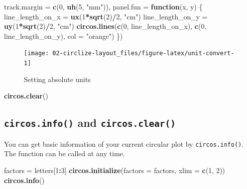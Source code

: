 \documentclass[]{book}
\newenvironment{Shaded}{\begin{snugshade}}{\end{snugshade}}
\newcommand{\KeywordTok}[1]{\textcolor[rgb]{0.13,0.29,0.53}{\textbf{#1}}}
\newcommand{\DataTypeTok}[1]{\textcolor[rgb]{0.13,0.29,0.53}{#1}}
\newcommand{\DecValTok}[1]{\textcolor[rgb]{0.00,0.00,0.81}{#1}}
\newcommand{\StringTok}[1]{\textcolor[rgb]{0.31,0.60,0.02}{#1}}
\newcommand{\ControlFlowTok}[1]{\textcolor[rgb]{0.13,0.29,0.53}{\textbf{#1}}}
\newcommand{\OperatorTok}[1]{\textcolor[rgb]{0.81,0.36,0.00}{\textbf{#1}}}
\newcommand{\NormalTok}[1]{#1}
\begin{document}
\begin{Shaded}
\begin{Highlighting}[]
    \DataTypeTok{track.margin =} \KeywordTok{c}\NormalTok{(}\DecValTok{0}\NormalTok{, }\KeywordTok{uh}\NormalTok{(}\DecValTok{5}\NormalTok{, }\StringTok{"mm"}\NormalTok{)),}
    \DataTypeTok{panel.fun =} \ControlFlowTok{function}\NormalTok{(x, y) \{}
\NormalTok{        line_length_on_x =}\StringTok{ }\KeywordTok{ux}\NormalTok{(}\DecValTok{1}\OperatorTok{*}\KeywordTok{sqrt}\NormalTok{(}\DecValTok{2}\NormalTok{)}\OperatorTok{/}\DecValTok{2}\NormalTok{, }\StringTok{"cm"}\NormalTok{)}
\NormalTok{        line_length_on_y =}\StringTok{ }\KeywordTok{uy}\NormalTok{(}\DecValTok{1}\OperatorTok{*}\KeywordTok{sqrt}\NormalTok{(}\DecValTok{2}\NormalTok{)}\OperatorTok{/}\DecValTok{2}\NormalTok{, }\StringTok{"cm"}\NormalTok{)}
        \KeywordTok{circos.lines}\NormalTok{(}\KeywordTok{c}\NormalTok{(}\DecValTok{0}\NormalTok{, line_length_on_x), }\KeywordTok{c}\NormalTok{(}\DecValTok{0}\NormalTok{, line_length_on_y), }\DataTypeTok{col =} \StringTok{"orange"}\NormalTok{)}
\NormalTok{    \})}
\end{Highlighting}
\end{Shaded}

\begin{figure}

{\centering \texttt{[image: 02-circlize-layout\_files/figure-latex/unit-convert-1]} 

}

\caption{Setting absolute units}\label{fig:unit-convert}
\end{figure}

\begin{Shaded}
\begin{Highlighting}[]
\KeywordTok{circos.clear}\NormalTok{()}
\end{Highlighting}
\end{Shaded}

\subsection{\texorpdfstring{\texttt{circos.info()} and
\texttt{circos.clear()}}{circos.info() and circos.clear()}}\label{circos-info-and-circos-clear}

You can get basic information of your current circular plot by
\texttt{circos.info()}. The function can be called at any time.

\begin{Shaded}
\begin{Highlighting}[]
\NormalTok{factors =}\StringTok{ }\NormalTok{letters[}\DecValTok{1}\OperatorTok{:}\DecValTok{3}\NormalTok{]}
\KeywordTok{circos.initialize}\NormalTok{(}\DataTypeTok{factors =}\NormalTok{ factors, }\DataTypeTok{xlim =} \KeywordTok{c}\NormalTok{(}\DecValTok{1}\NormalTok{, }\DecValTok{2}\NormalTok{))}
\KeywordTok{circos.info}\NormalTok{()}
\end{Highlighting}
\end{Shaded}
\end{document}
